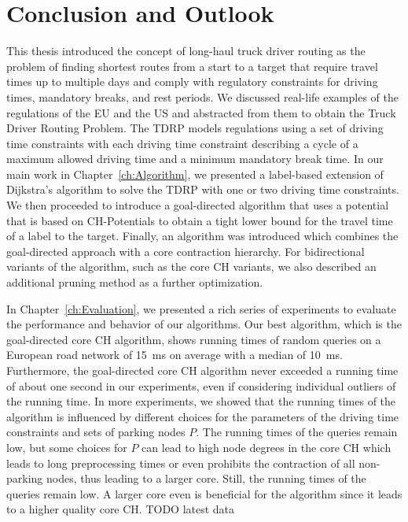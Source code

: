 
\chapter{Conclusion and Outlook}
\label{ch:conclusion}
This thesis introduced the concept of long-haul truck driver routing as the problem of finding shortest routes from a start to a target that require travel times up to multiple days and comply with regulatory constraints for driving times, mandatory breaks, and rest periods. We discussed real-life examples of the regulations of the EU and the US and abstracted from them to obtain the Truck Driver Routing Problem. The TDRP models regulations using a set of driving time constraints with each driving time constraint describing a cycle of a maximum allowed driving time and a minimum mandatory break time. In our main work in Chapter~\ref{ch:Algorithm}, we presented a label-based extension of Dijkstra's algorithm to solve the TDRP with one or two driving time constraints. We then proceeded to introduce a goal-directed algorithm that uses a potential that is based on CH-Potentials to obtain a tight lower bound for the travel time of a label to the target. Finally, an algorithm was introduced which combines the goal-directed approach with a core contraction hierarchy. For bidirectional variants of the algorithm, such as the core CH variants, we also described an additional pruning method as a further optimization.

In Chapter~\ref{ch:Evaluation}, we presented a rich series of experiments to evaluate the performance and behavior of our algorithms. Our best algorithm, which is the goal-directed core CH algorithm, shows running times of random queries on a European road network of \SI{15}{\milli\second} on average with a median of \SI{10}{\milli\second}. Furthermore, the goal-directed core CH algorithm never exceeded a running time of about one second in our experiments, even if considering individual outliers of the running time. In more experiments, we showed that the running times of the algorithm is influenced by different choices for the parameters of the driving time constraints and sets of parking nodes $P$. The running times of the queries remain low, but some choices for $P$ can lead to high node degrees in the core CH which leads to long preprocessing times or even prohibits the contraction of all non-parking nodes, thus leading to a larger core. Still, the running times of the queries remain low. A larger core even is beneficial for the algorithm since it leads to a higher quality core CH. TODO latest data

